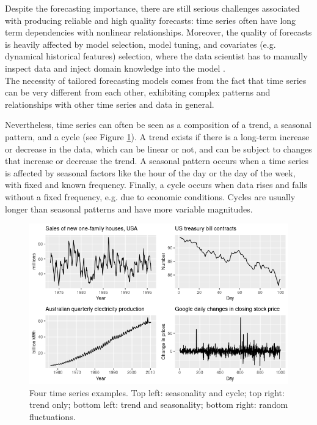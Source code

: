 \documentclass[a4paper, 12pt]{article} %
\begin{document}
	Despite the forecasting importance, there are still serious challenges associated with producing reliable and high quality forecasts: time series often have long term dependencies with nonlinear relationships.  Moreover, the quality of forecasts is heavily affected by model selection, model tuning, and covariates (e.g. dynamical historical features) selection, where the data scientist has to manually inspect data and inject domain knowledge into the model \cite{DeepLearningForecastingSurvey, FacebookProphet}.\\
	The necessity of tailored forecasting models comes from the fact that time series can be very different from each other, exhibiting complex patterns and relationships with other time series and data in general. 
	
	Nevertheless, time series can often be seen as a composition of a trend, a seasonal pattern, and a cycle \cite{ForecastingHyndmanAthanasopoulos} (see Figure \ref{fig:time_series_components}).
	A trend exists if there is a long-term increase or decrease in the data, which can be linear or not, and can be subject to changes that increase or decrease the trend.
	A seasonal pattern occurs when a time series is affected by seasonal factors like the hour of the day or the day of the week, with fixed and known frequency.
	Finally, a cycle occurs when data rises and falls without a fixed frequency, e.g. due to economic conditions.  Cycles are usually longer than seasonal patterns and have more variable magnitudes.
	
	\begin{figure}
	\includegraphics[width=\linewidth]{img/sota_ts_components.png}
	\caption{Four time series examples. Top left: seasonality and cycle; top right: trend only; bottom left: trend and seasonality; bottom right: random fluctuations.}
	\label{fig:time_series_components}
	\end{figure}
	
\end{document}
